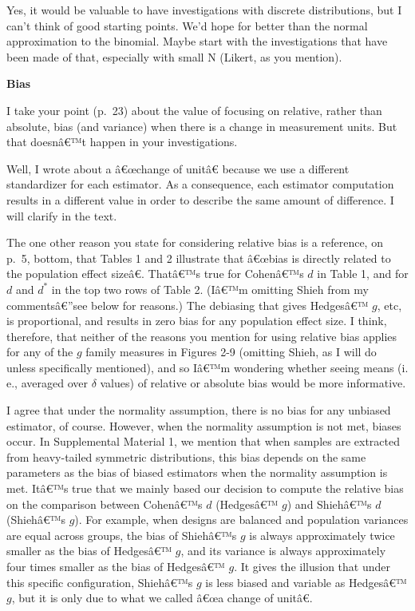 \begin{appendix}
\color{brown} Yes, it would be valuable to have investigations with
discrete distributions, but I can't think of good starting points. We'd
hope for better than the normal approximation to the binomial. Maybe
start with the investigations that have been made of that, especially
with small N (Likert, as you mention).

\color{black}\textbf{Bias}

I take your point (p.~23) about the value of focusing on relative,
rather than absolute, bias (and variance) when there is a change in
measurement units. But that doesnâ€™t happen in your investigations.

\color{blue} Well, I wrote about a â€œchange of unitâ€ because we use a
different standardizer for each estimator. As a consequence, each
estimator computation results in a different value in order to describe
the same amount of difference. I will clarify in the text.

\color{black} The one other reason you state for considering relative
bias is a reference, on p.~5, bottom, that Tables 1 and 2 illustrate
that â€œbias is directly related to the population effect sizeâ€.
Thatâ€™s true for Cohenâ€™s \(d\) in Table 1, and for \(d\) and \(d^*\)
in the top two rows of Table 2. (Iâ€™m omitting Shieh from my
commentsâ€''see below for reasons.) The debiasing that gives Hedgesâ€™
\(g\), etc, is proportional, and results in zero bias for any population
effect size. I think, therefore, that neither of the reasons you mention
for using relative bias applies for any of the \(g\) family measures in
Figures 2-9 (omitting Shieh, as I will do unless specifically
mentioned), and so Iâ€™m wondering whether seeing means (i. e., averaged
over \(\delta\) values) of relative or absolute bias would be more
informative.

\color{blue} I agree that under the normality assumption, there is no
bias for any unbiased estimator, of course. However, when the normality
assumption is not met, biases occur. In Supplemental Material 1, we
mention that when samples are extracted from heavy-tailed symmetric
distributions, this bias depends on the same parameters as the bias of
biased estimators when the normality assumption is met. Itâ€™s true that
we mainly based our decision to compute the relative bias on the
comparison between Cohenâ€™s \(d\) (Hedgesâ€™ \(g\)) and Shiehâ€™s \(d\)
(Shiehâ€™s \(g\)). For example, when designs are balanced and population
variances are equal across groups, the bias of Shiehâ€™s \(g\) is always
approximately twice smaller as the bias of Hedgesâ€™ \(g\), and its
variance is always approximately four times smaller as the bias of
Hedgesâ€™ \(g\). It gives the illusion that under this specific
configuration, Shiehâ€™s \(g\) is less biased and variable as Hedgesâ€™
\(g\), but it is only due to what we called â€œa change of unitâ€.


\end{appendix}
